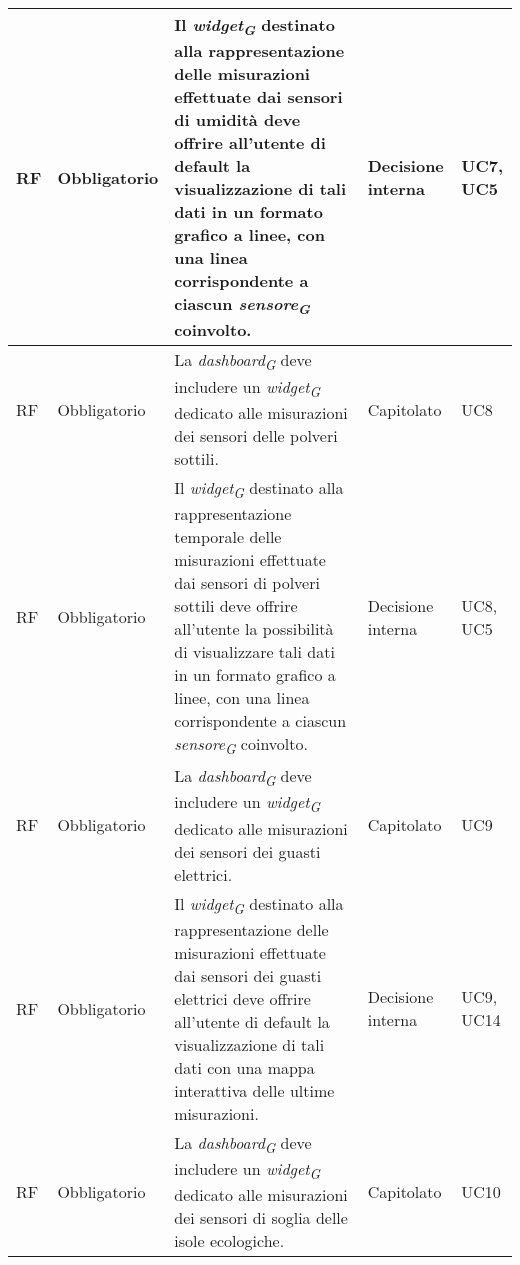 \begin{longtable}{|C{1.5cm}|C{2cm}|L{5cm}|C{2cm}|C{1.5cm}|}
    \hline
     RF & Obbligatorio &Il \textit{widget}\textsubscript{\textit{G}} destinato alla rappresentazione delle misurazioni effettuate dai sensori di umidità deve offrire all'utente di default la visualizzazione di tali dati in un formato grafico a linee, con una linea corrispondente a ciascun \textit{sensore}\textsubscript{\textit{G}} coinvolto.& Decisione interna & UC7, UC5 \\
    
    \hline
     RF & Obbligatorio & La \textit{dashboard}\textsubscript{\textit{G}} deve includere un \textit{widget}\textsubscript{\textit{G}} dedicato alle misurazioni dei sensori delle polveri sottili.& Capitolato & UC8 \\
    
    \hline
     RF & Obbligatorio &Il \textit{widget}\textsubscript{\textit{G}} destinato alla rappresentazione temporale delle misurazioni effettuate dai sensori di polveri sottili deve offrire all'utente la possibilità di visualizzare tali dati in un formato grafico a linee, con una linea corrispondente a ciascun \textit{sensore}\textsubscript{\textit{G}} coinvolto.& Decisione interna & UC8, UC5\\
    
    \hline
     RF & Obbligatorio & La \textit{dashboard}\textsubscript{\textit{G}} deve includere un \textit{widget}\textsubscript{\textit{G}} dedicato alle misurazioni dei sensori dei guasti elettrici.& Capitolato & UC9 \\
    
    \hline
     RF & Obbligatorio &Il \textit{widget}\textsubscript{\textit{G}} destinato alla rappresentazione delle misurazioni effettuate dai sensori dei guasti elettrici deve offrire all'utente di default la visualizzazione di tali dati con una mappa interattiva delle ultime misurazioni.  & Decisione interna & UC9, UC14 \\
    
    \hline
     RF & Obbligatorio & La \textit{dashboard}\textsubscript{\textit{G}} deve includere un \textit{widget}\textsubscript{\textit{G}} dedicato alle misurazioni dei sensori di soglia delle isole ecologiche.& Capitolato & UC10 \\
    

\end{longtable}
